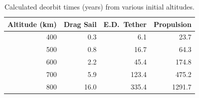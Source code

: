 \begin{table}[H]
\centering
\caption{Calculated deorbit times (years) from various initial altitudes.}
\label{tab:times}
\begin{tabular}{rrrr}
\toprule
Altitude (km) & Drag Sail & E.D.\ Tether & Propulsion \\
\midrule
400 & 0.3 & 6.1 & 23.7 \\
500 & 0.8 & 16.7 & 64.3 \\
600 & 2.2 & 45.4 & 174.8 \\
700 & 5.9 & 123.4 & 475.2 \\
800 & 16.0 & 335.4 & 1291.7 \\
\bottomrule
\end{tabular}
\end{table}

